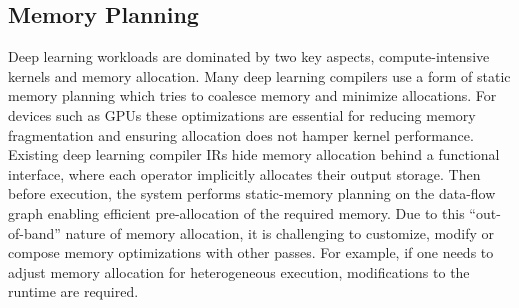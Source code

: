 
\subsection{Memory Planning}
\label{sec:compliation:memory}
Deep learning workloads are dominated by two key aspects, compute-intensive kernels and memory allocation. Many deep learning compilers use a form of static memory planning which tries to coalesce memory and minimize allocations. For devices such as GPUs these optimizations are essential for reducing memory fragmentation and ensuring allocation does not hamper kernel performance. Existing deep learning compiler IRs hide memory allocation behind a functional interface, where each operator implicitly allocates their output storage. Then before execution, the system performs static-memory planning on the data-flow graph enabling efficient pre-allocation of the required memory. Due to this ``out-of-band'' nature of memory allocation, it is challenging to customize, modify or compose memory optimizations with other passes. For example, if one needs to adjust memory allocation for heterogeneous execution, modifications to the runtime are required.


